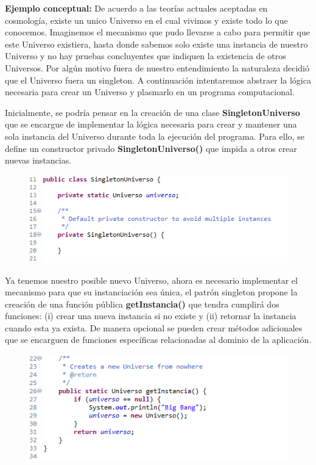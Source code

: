 \textbf{Ejemplo conceptual:} De acuerdo a las teorías actuales aceptadas en cosmología, existe un unico Universo en el cual vivimos y existe todo lo que conocemos. Imaginemos el mecanismo que pudo llevarse a cabo para permitir que este Universo existiera, hasta donde sabemos solo existe una instancia de nuestro Universo y no hay pruebas concluyentes que indiquen la existencia de otros Universos. Por algún motivo fuera de nuestro entendimiento la naturaleza decidió que el Universo fuera un singleton. A continuación intentaremos abstraer la lógica necesaria para crear un Universo y plasmarlo en un programa computacional.

Inicialmente, se podría pensar en la creación de una clase \textbf{SingletonUniverso} que se encargue de implementar la lógica necesaria para crear y mantener una sola instancia del Universo durante toda la ejecución del programa. Para ello, se define un constructor privado \textbf{SingletonUniverso()} que impida a otros crear nuevas instancias.

\begin{figure}[H]
	\includegraphics{images/creational/singleton/singletonExample1.png}
\end{figure}

Ya tenemos nuestro posible nuevo Universo, ahora es necesario implementar el mecanismo para que su instanciación sea única, el patrón singleton propone la creación de una función pública  \textbf{getInstancia()} que tendra cumplirá dos funciones: (i) crear una nueva instancia si no existe y (ii) retornar la instancia cuando esta ya exista. De manera opcional se pueden crear métodos adicionales que se encarguen de funciones específicas relacionadas al dominio de la aplicación.

\begin{figure}[H]
	\includegraphics{images/creational/singleton/singletonExample2.png}
\end{figure}


